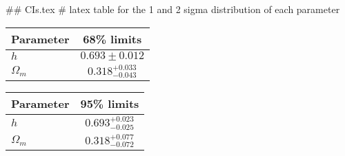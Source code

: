 ## CIs.tex
# latex table for the 1 and 2 sigma distribution of each parameter

\begin{tabular} { l  c}
 Parameter &  68\% limits\\
\hline
{\boldmath$h              $} & $0.693\pm 0.012            $\\
{\boldmath$\Omega_m       $} & $0.318^{+0.033}_{-0.043}   $\\
\hline
\end{tabular}

\begin{tabular} { l  c}
 Parameter &  95\% limits\\
\hline
{\boldmath$h              $} & $0.693^{+0.023}_{-0.025}   $\\
{\boldmath$\Omega_m       $} & $0.318^{+0.077}_{-0.072}   $\\
\hline
\end{tabular}
